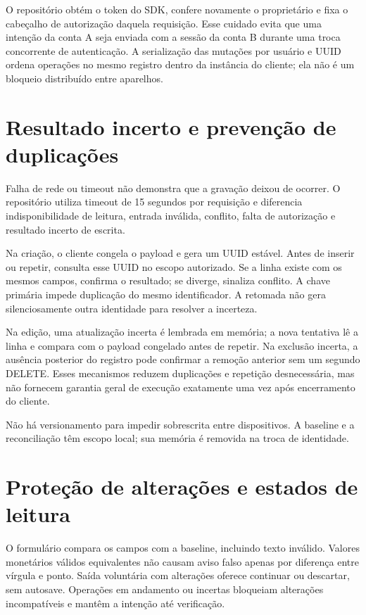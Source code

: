 \documentclass[
    12pt,
    oneside,
    a4paper,
    brazil
]{abntex2}
\begin{document}
O repositório obtém o token do SDK, confere novamente o proprietário e fixa o cabeçalho de autorização daquela requisição. Esse cuidado evita que uma intenção da conta A seja enviada com a sessão da conta B durante uma troca concorrente de autenticação. A serialização das mutações por usuário e UUID ordena operações no mesmo registro dentro da instância do cliente; ela não é um bloqueio distribuído entre aparelhos.

\section{Resultado incerto e prevenção de duplicações}

Falha de rede ou timeout não demonstra que a gravação deixou de ocorrer. O repositório utiliza timeout de 15 segundos por requisição e diferencia indisponibilidade de leitura, entrada inválida, conflito, falta de autorização e resultado incerto de escrita.

Na criação, o cliente congela o payload e gera um UUID estável. Antes de inserir ou repetir, consulta esse UUID no escopo autorizado. Se a linha existe com os mesmos campos, confirma o resultado; se diverge, sinaliza conflito. A chave primária impede duplicação do mesmo identificador. A retomada não gera silenciosamente outra identidade para resolver a incerteza.

Na edição, uma atualização incerta é lembrada em memória; a nova tentativa lê a linha e compara com o payload congelado antes de repetir. Na exclusão incerta, a ausência posterior do registro pode confirmar a remoção anterior sem um segundo DELETE. Esses mecanismos reduzem duplicações e repetição desnecessária, mas não fornecem garantia geral de execução exatamente uma vez após encerramento do cliente.

Não há versionamento para impedir sobrescrita entre dispositivos. A baseline e a reconciliação têm escopo local; sua memória é removida na troca de identidade.

\section{Proteção de alterações e estados de leitura}

O formulário compara os campos com a baseline, incluindo texto inválido. Valores monetários válidos equivalentes não causam aviso falso apenas por diferença entre vírgula e ponto. Saída voluntária com alterações oferece continuar ou descartar, sem autosave. Operações em andamento ou incertas bloqueiam alterações incompatíveis e mantêm a intenção até verificação.
\end{document}
